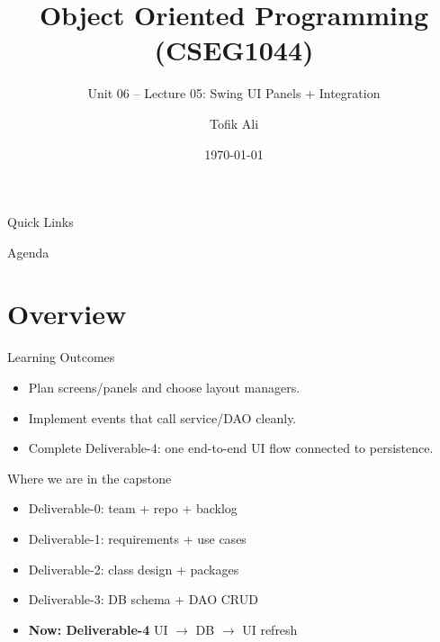 \documentclass{beamer}
\title[OOPS with Java]{Object Oriented Programming (CSEG1044)}
\subtitle{Unit 06 -- Lecture 05: Swing UI Panels + Integration}
\author{Tofik Ali}
\institute{School of Computer Science, UPES Dehradun}
\date{\today}
\begin{document}
\begin{frame}[fragile]
  \titlepage
  \vspace{0.5em}
  \slidesources{\OOPSUnitVISources}
\end{frame}

\begin{frame}{Quick Links}
  \centering
  \hyperlink{sec:overview}{}\hspace{0.6em}
  \hyperlink{sec:concepts}{}\hspace{0.6em}
  \hyperlink{sec:demo}{}\hspace{0.6em}
  \hyperlink{sec:summary}{}
  \slidesources{\OOPSUnitVISources}
\end{frame}

\begin{frame}{Agenda}
  \tableofcontents
  \slidesources{\OOPSUnitVISources}
\end{frame}

\section{Overview}
\label{sec:overview}

\begin{frame}{Learning Outcomes}
  \begin{itemize}[<+->]
    \item Plan screens/panels and choose layout managers.
    \item Implement events that call service/DAO cleanly.
    \item Complete Deliverable-4: one end-to-end UI flow connected to persistence.
  \end{itemize}
  \slidesources{\OOPSUnitVISources}
\end{frame}

\begin{frame}{Where we are in the capstone}
  \begin{itemize}[<+->]
    \item Deliverable-0: team + repo + backlog
    \item Deliverable-1: requirements + use cases
    \item Deliverable-2: class design + packages
    \item Deliverable-3: DB schema + DAO CRUD
    \item \textbf{Now: Deliverable-4} UI $\rightarrow$ DB $\rightarrow$ UI refresh
  \end{itemize}
  \slidesources{\OOPSUnitVISources}
\end{frame}
\end{document}
